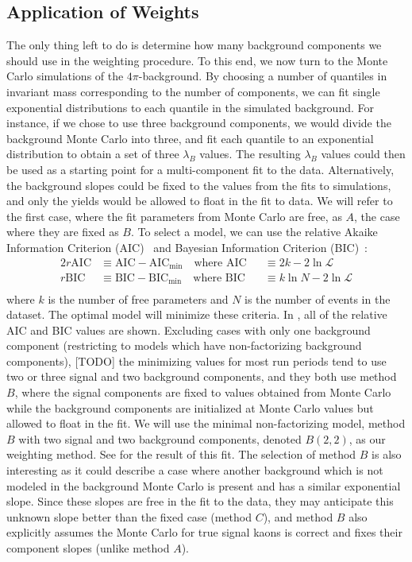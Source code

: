 \subsection{Application of Weights}\label{sec:application-of-weights}

The only thing left to do is determine how many background components we should use in the weighting procedure. To this end, we now turn to the Monte Carlo simulations of the $4\pi$-background. By choosing a number of quantiles in invariant mass corresponding to the number of components, we can fit single exponential distributions to each quantile in the simulated background. For instance, if we chose to use three background components, we would divide the background Monte Carlo into three, and fit each quantile to an exponential distribution to obtain a set of three $\lambda_B$ values. The resulting  $\lambda_B$ values could then be used as a starting point for a multi-component fit to the data. Alternatively, the background slopes could be fixed to the values from the fits to simulations, and only the yields would be allowed to float in the fit to data. We will refer to the first case, where the fit parameters from Monte Carlo are free, as $A$, the case where they are fixed as $B$. To select a model, we can use the relative Akaike Information Criterion (AIC)~\cite{akaike_information_1998} and Bayesian Information Criterion (BIC)~\cite{schwarz_estimating_1978}:
\begin{alignat}{2}
  r\text{AIC} &\equiv \text{AIC} - \text{AIC}_\text{min} \quad\text{where } \text{AIC} &&\equiv 2k - 2\ln\mathcal{L} \\
  r\text{BIC} &\equiv \text{BIC} - \text{BIC}_\text{min} \quad\text{where } \text{BIC} &&\equiv k\ln{N} - 2\ln\mathcal{L} \\
  \label{eq:information-criteria}
\end{alignat}
where $k$ is the number of free parameters and $N$ is the number of events in the dataset. The optimal model will minimize these criteria. In , all of the relative AIC and BIC values are shown. Excluding cases with only one background component (restricting to models which have non-factorizing background components), {\color{red}[TODO]} the minimizing values for most run periods tend to use two or three signal and two background components, and they both use method $B$, where the signal components are fixed to values obtained from Monte Carlo while the background components are initialized at Monte Carlo values but allowed to float in the fit. We will use the minimal non-factorizing model, method $B$ with two signal and two background components, denoted $B(2,2)$, as our weighting method. See  for the result of this fit. The selection of method $B$ is also interesting as it could describe a case where another background which is not modeled in the background Monte Carlo is present and has a similar exponential slope. Since these slopes are free in the fit to the data, they may anticipate this unknown slope better than the fixed case (method $C$), and method $B$ also explicitly assumes the Monte Carlo for true signal kaons is correct and fixes their component slopes (unlike method $A$).

